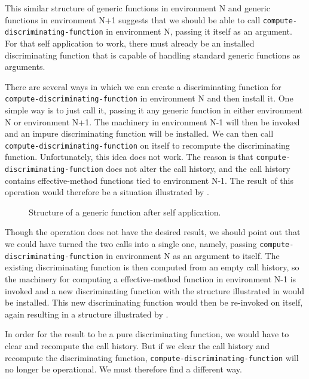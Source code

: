 This similar structure of generic functions in environment N and
generic functions in environment N+1 suggests that we should be able
to call \texttt{compute-discriminating-function} in environment N,
passing it itself as an argument.  For that self application to work,
there must already be an installed discriminating function that is
capable of handling standard generic functions as arguments. 

There are several ways in which we can create a discriminating
function for \texttt{compute-discriminating-function} in environment N
and then install it.  One simple way is to just call it, passing it
any generic function in either environment N or environment N+1.  The
machinery in environment N-1 will then be invoked and an impure
discriminating function will be installed.  We can then call
\texttt{compute-discriminating-function} on itself to recompute the
discriminating function.  Unfortunately, this idea does not work.  The
reason is that \texttt{compute-discriminating-function} does not alter
the call history, and the call history contains effective-method
functions tied to environment N-1.  The result of this operation would
therefore be a situation illustrated by
.

\begin{figure}
\begin{center}
\end{center}
\caption{\label{fig-structure-of-generic-function-2}
Structure of a generic function after self application.}
\end{figure}


Though the operation does not have the desired result, we should point
out that we could have turned the two calls into a single one, namely,
passing \texttt{compute-discriminating-function} in environment N as
an argument to itself.  The existing discriminating function is then
computed from an empty call history, so the machinery for computing a
effective-method function in environment N-1 is invoked and a new
discriminating function with the structure illustrated in
 would be installed.  This
new discriminating function would then be re-invoked on itself, again
resulting in a structure illustrated by
.

In order for the result to be a pure discriminating function, we would
have to clear and recompute the call history.  But if we clear the
call history and recompute the discriminating function,
\texttt{compute-discriminating-function} will no longer be
operational.  We must therefore find a different way.

